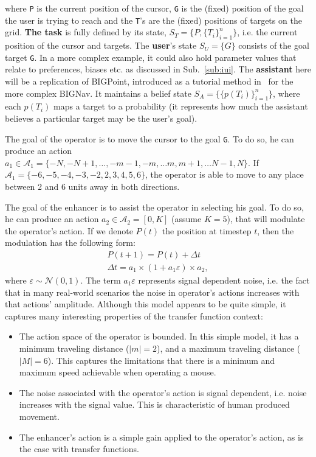 \documentclass[12pt,a4paper]{article}
\begin{document}
\noindent where \texttt{P} is the current position of the cursor, \texttt{G} is the (fixed) position of the goal the user is trying to reach and the \texttt{T}'s are the (fixed) positions of targets on the grid.
\textbf{The task} is fully defined by its state, $S_T = \lbrace P, \lbrace T_i \rbrace_{i=1}^n \rbrace$, i.e. the current position of the cursor and targets. The \textbf{user}'s state $S_U = \lbrace G \rbrace$ consists of the goal target \texttt{G}. In a more complex example, it could also hold parameter values that relate to preferences, biases etc. as discussed in Sub.~\ref{sub:iui}. The \textbf{assistant} here will be a replication of BIGPoint, introduced as a tutorial method in~\cite{lui2017} for the more complex BIGNav. It maintains a belief state $S_A = \lbrace \lbrace p(T_i) \rbrace_{i=1}^n \rbrace$, where each $p(T_i)$ maps a target to a probability (it represents how much the assistant believes a particular target may be the user's goal).





The goal of the operator is to move the cursor to the goal \texttt{G}. To do so, he can produce an action $a_1 \in \mathcal{A}_1 =  \lbrace -N, -N +1, \dots{}, -m -1, -m, \dots{} m, m+1, \dots{} N-1, N \rbrace$. If $\mathcal{A}_1 = \lbrace-6, -5, -4, -3, -2, 2, 3, 4, 5, 6 \rbrace$, the operator is able to move to any place between 2 and 6 units away in both directions. 


The goal of the enhancer is to assist the operator in selecting his goal. To do so, he can produce an action $a_2 \in \mathcal{A}_2 = [0,K]$ (assume $K=5$), that will modulate the operator's action. If we denote $P(t)$ the position at timestep $t$, then the modulation has the following form:
\begin{align}
P(t+1) = P(t) + \Delta t \label{eq:toy_problem_model_1} \\
\Delta t =  a_1 \times (1 + a_1 \varepsilon) \times a_2, \label{eq:toy_problem_model_2}
\end{align}
\noindent where $\varepsilon \sim  \mathcal{N}(0,1)$. The term $a_1 \varepsilon$ represents signal dependent noise, i.e. the fact that in many real-world scenarios the noise in operator's actions increases with that actions' amplitude.
Although this model appears to be quite simple, it captures many interesting properties of the transfer function context:

\begin{itemize}
\item The action space of the operator is bounded. In this simple model, it has a minimum traveling distance ($|m|=2$), and a maximum traveling distance ($|M| = 6$). This captures the limitations that there is a minimum and maximum speed achievable when operating a mouse.
\item The noise associated with the operator's action is signal dependent, i.e. noise increases with the signal value. This is characteristic of human produced movement.
\item The enhancer's action is a simple gain applied to the operator's action, as is the case with transfer functions.
\end{itemize}
\end{document}
